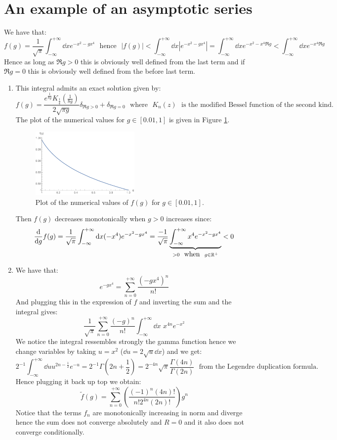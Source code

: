 \documentclass[10pt,a4paper]{article}
\begin{document}
\section[Exercise]{An example of an asymptotic series}

We have that:
\[
f(g) = \frac{1}{\sqrt{\pi}} \int_{-\infty}^{+\infty} \dd x e^{-x^2 - g x^4} \mbox{~~hence~~} |f(g)| < \int_{-\infty}^{+\infty} \dd x | e^{-x^2 - g x^4}| = \int_{-\infty}^{+\infty} \dd x e^{-x^2 - x^4 \Re g} < \int_{-\infty}^{+\infty} \dd x e^{-x^4 \Re g}
\]
Hence as long as $\Re g > 0$ this is obviously well defined from the last term and if $\Re g = 0$ this is obviously well defined from the before last term.

\begin{enumerate}
\item This integral admits an exact solution given by:
\[
f(g) = \frac{e^{\frac{1}{8g}} K_{\frac{1}{4}}(\frac{1}{8g})}{2\sqrt{\pi g}} \delta_{\Re g > 0} + \delta_{\Re g = 0} \mbox{~~where~~} K_n(z) \mbox{~~is the modified Bessel function of the second kind.}
\]
The plot of the numerical values for $g \in [0.01, 1]$ is given in Figure \ref{integral:1}.
\begin{figure}
\centering
\includegraphics[width = 0.5\textwidth]{integral1}
\caption{Plot of the numerical values of $f(g)$ for $g \in [0.01, 1]$. }\label{integral:1}
\end{figure}
Then $f(g)$ decreases monotonically when $g > 0$ increases since:
\[
\dv{}{g} f(g) = \frac{1}{\sqrt{\pi}} \int_{-\infty}^{+\infty} \dd x (-x^4) e^{-x^2 - g x^4} = \frac{-1}{\sqrt{\pi}} \underbrace{\int_{-\infty}^{+\infty} x^4 e^{-x^2 - g x^4}}_{ > 0 \mbox{~~when~~} g \in \mathbb{R}^+} < 0
\]

\item We have that:
\[
e^{-g x^4} = \sum_{n = 0}^{+\infty} \frac{(-gx^4)^n}{n!}
\]
And plugging this in the expression of $f$ and inverting the sum and the integral gives:
\[
\frac{1}{\sqrt{\pi}} \sum_{n = 0}^{+\infty} \frac{(-g)^n}{n!} \int_{-\infty}^{+\infty} \dd x\,\, x^{4n} e^{-x^2}
\]
We notice the integral ressembles strongly the gamma function hence we change variables by taking $u = x^2$ ($\dd u = 2 \sqrt{u} \dd x$) and we get:
\[
2^{-1} \int_{-\infty}^{+\infty} \dd u u^{2n - \frac{1}{2}} e^{-u} = 2^{-1} \Gamma(2n + \frac{1}{2}) = 2^{-4n} \sqrt{\pi} \frac{\Gamma(4n)}{\Gamma(2n)} \mbox{~~from the Legendre duplication formula.}
\]
Hence plugging it back up top we obtain:
\[
\tilde{f}(g) = \sum_{n = 0}^{+\infty} \left( \frac{(-1)^n(4n)!}{n! 2^{4n} (2n)!} \right) g^n
\]
Notice that the terms $f_n$ are monotonically increasing in norm and diverge hence the sum does not converge absolutely and $R = 0$ and it also does not converge conditionally. 


\end{enumerate}
\end{document}
